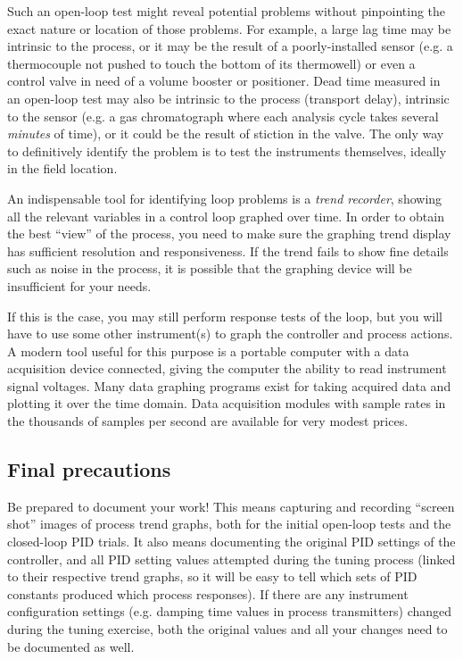 Such an open-loop test might reveal potential problems without pinpointing the exact nature or location of those problems.  For example, a large lag time may be intrinsic to the process, or it may be the result of a poorly-installed sensor (e.g. a thermocouple not pushed to touch the bottom of its thermowell) or even a control valve in need of a volume booster or positioner.  Dead time measured in an open-loop test may also be intrinsic to the process (transport delay), intrinsic to the sensor (e.g. a gas chromatograph where each analysis cycle takes several \textit{minutes} of time), or it could be the result of stiction in the valve.  The only way to definitively identify the problem is to test the instruments themselves, ideally in the field location.

\vskip 10pt

An indispensable tool for identifying loop problems is a \textit{trend recorder}, showing all the relevant variables in a control loop graphed over time.  In order to obtain the best ``view'' of the process, you need to make sure the graphing trend display has sufficient resolution and responsiveness.  If the trend fails to show fine details such as noise in the process, it is possible that the graphing device will be insufficient for your needs.    

If this is the case, you may still perform response tests of the loop, but you will have to use some other instrument(s) to graph the controller and process actions.  A modern tool useful for this purpose is a portable computer with a data acquisition device connected, giving the computer the ability to read instrument signal voltages.  Many data graphing programs exist for taking acquired data and plotting it over the time domain.  Data acquisition modules with sample rates in the thousands of samples per second are available for very modest prices.  










\filbreak
\subsection{Final precautions}

Be prepared to document your work!  This means capturing and recording ``screen shot'' images of process trend graphs, both for the initial open-loop tests and the closed-loop PID trials.  It also means documenting the original PID settings of the controller, and all PID setting values attempted during the tuning process (linked to their respective trend graphs, so it will be easy to tell which sets of PID constants produced which process responses).  If there are any instrument configuration settings (e.g. damping time values in process transmitters) changed during the tuning exercise, both the original values and all your changes need to be documented as well.

